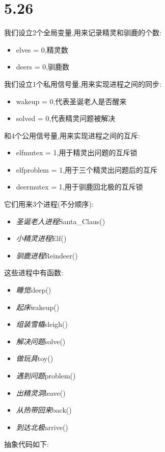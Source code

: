 \documentclass[UTF8]{ctexart}
\begin{document}
    \section{5.26}
    \noindent 我们设立2个全局变量,用来记录精灵和驯鹿的个数:
    \begin{itemize}
        \item elves = 0,精灵数
        \item deers = 0,驯鹿数
    \end{itemize}
    \noindent 我们设立1个私用信号量,用来实现进程之间的同步:
    \begin{itemize}
        \item wakeup = 0,代表圣诞老人是否醒来
        \item solved = 0,代表精灵问题被解决
    \end{itemize}
    和4个公用信号量,用来实现进程之间的互斥:
    \begin{itemize}
        \item elfmutex = 1,用于精灵出问题的互斥锁
        \item elfproblem = 1,用于三个精灵出问题后的互斥
        \item deermutex = 1,用于驯鹿回北极的互斥锁
        
    \end{itemize}
    它们用来3个进程(不分顺序):
    \begin{itemize}
        \item \emph{圣诞老人进程}Santa\_Claus()
        \item \emph{小精灵进程}Elf()
        \item \emph{驯鹿进程}Reindeer()
    \end{itemize}
    这些进程中有函数:
    \begin{itemize}
        \item \emph{睡觉}sleep()
        \item \emph{起床}wakeup()
        \item \emph{组装雪橇}sleigh()
        \item \emph{解决问题}solve()
        \item \emph{做玩具}toy()
        \item \emph{遇到问题}problem()
        \item \emph{出精灵洞}leave()
        \item \emph{从热带回来}back()
        \item \emph{到达北极}arrive()
    \end{itemize}
    抽象代码如下:
\end{document}

